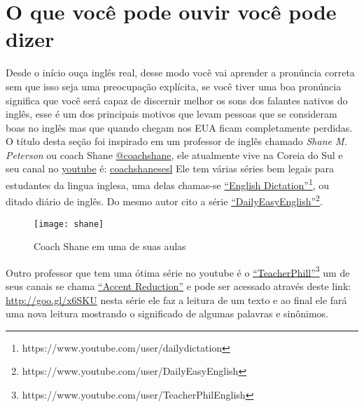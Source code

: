 
\chapter{O que você pode ouvir você pode dizer}\label{cha:listening}

Desde o início ouça inglês real, desse modo você vai aprender a pronúncia
correta sem que isso seja uma preocupação explícita, se você tiver uma boa
pronúncia significa que você será capaz de discernir melhor os sons dos
falantes nativos do inglês, esse é um dos principais motivos que levam pessoas
que se consideram boas no inglês mas que quando chegam nos EUA ficam
completamente perdidas. O título desta seção foi inspirado em um professor de
inglês chamado \emph{Shane M. Peterson} ou \hypertarget{shane}{coach Shane}
\href{https://twitter.com/coachshane}{@coachshane}, ele atualmente vive na
Coreia do Sul e seu canal no 
\href{http://www.youtube.com}{youtube} é:
\href{https://www.youtube.com/user/coachshanesesl}{coachshanesesl} Ele tem
várias séries bem legais para estudantes da lingua inglesa, uma delas chamas-se
\href{https://www.youtube.com/user/dailydictation}{``English
Dictation''}\footnote{https://www.youtube.com/user/dailydictation}, ou ditado
diário de inglês. Do mesmo autor cito a série
\href{ttps://www.youtube.com/user/DailyEasyEnglish}{``DailyEasyEnglish''}\footnote
{https://www.youtube.com/user/DailyEasyEnglish}.

\begin{figure}[h!]
	\centering
	\texttt{[image: shane]}
	\caption{Coach Shane em uma de suas aulas}
\end{figure}

\noindent Outro professor que tem uma ótima série no youtube é o 
\href{https://www.youtube.com/user/TeacherPhilEnglish}{``TeacherPhill''}\footnote{https://www.youtube.com/user/TeacherPhilEnglish}
um de seus canais se chama
\href{https://www.youtube.com/course?list=EC6E296AEDF49E3528}{``Accent Reduction''} e pode ser acessado através deste link:
\href{http://goo.gl/x6SKU}{http://goo.gl/x6SKU} nesta série ele faz a leitura
de um texto e ao final ele fará uma nova leitura mostrando o significado de
algumas palavras e sinônimos.


